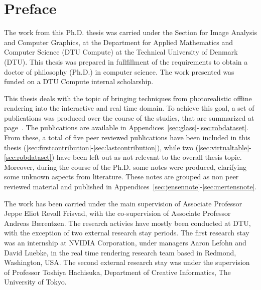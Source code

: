 \chapter{Preface}

The work from this Ph.D. thesis was carried under the Section for Image Analysis and Computer Graphics, at the Department for Applied Mathematics and Computer Science (DTU Compute) at the Technical University of Denmark (DTU). This thesis was prepared in fullfillment of the requirements to obtain a doctor of philosophy (Ph.D.) in computer science. The work presented was funded on a DTU Compute internal scholarship. 

This thesis deals with the topic of bringing techniques from photorealistic offline rendering into the interactive and real time domain. To achieve this goal, a set of publications was produced over the course of the studies, that are summarized at page~\pageref{sec:contributionlist}. The publications are available in Appendices~\ref{sec:glass}-\ref{sec:robdataset}. From these, a total of five peer reviewed publications have been included in this thesis (\ref{sec:firstcontribution}-\ref{sec:lastcontribution}), while two (\ref{sec:virtualtable}-\ref{sec:robdataset}) have been left out as not relevant to the overall thesis topic. Moreover, during the course of the Ph.D. some notes were produced, clarifying some unknown aspects from literature. These notes are grouped as non peer reviewed material and published in Appendices~\ref{sec:jensennote}-\ref{sec:mertensnote}. 

The work has been carried under the main supervision of Associate Professor Jeppe Eliot Revall Frisvad, with the co-supervision of Associate Professor Andreas B\ae rentzen. The research activies have mostly been conducted at DTU, with the exception of two external research stay periods. The first research stay was an internship at NVIDIA Corporation, under managers Aaron Lefohn and David Luebke, in the real time rendering research team based in Redmond, Washington, USA. The second external research stay was under the supervision of Professor Toshiya Hachisuka, Department of Creative Informatics, The University of Tokyo.

